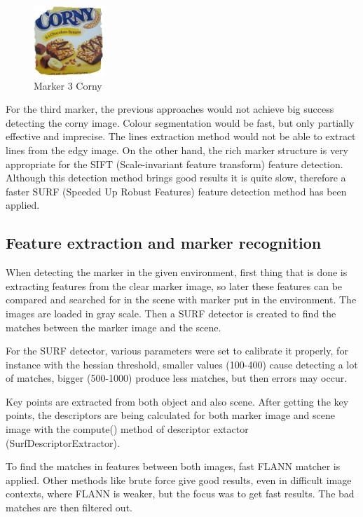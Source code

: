 \begin{figure}[ht!]
	\centering
	\includegraphics[width=100px]{figures/Marker3}
	\caption{Marker 3 Corny}
	\label{fig:markerCorny}
\end{figure}

For the third marker, the previous approaches would not achieve big success detecting the corny image. Colour segmentation would be fast, but only partially effective and imprecise. The lines extraction method would not be able to extract lines from the edgy image. On the other hand, the rich marker structure is very appropriate for the SIFT (Scale-invariant feature transform) feature detection. Although this detection method brings good results it is quite slow, therefore a faster SURF (Speeded Up Robust Features) feature detection method has been applied. 

\subsection{Feature extraction and marker recognition}

When detecting the marker in the given environment, first thing that is done is extracting features from the clear marker image, so later these features can be compared and searched for in the scene with marker put in the environment. The images are loaded in gray scale. Then a SURF detector is created to find the matches between the marker image and the scene. 

For the SURF detector, various parameters were set to calibrate it properly, for instance with the hessian threshold, smaller values (100-400) cause detecting a lot of matches, bigger (500-1000) produce less matches, but then errors may occur. 

Key points are extracted from both object and also scene. After getting the key points, the descriptors are being calculated for both marker image and scene image with the compute() method of descriptor extactor (SurfDescriptorExtractor). 

To find the matches in features between both images, fast FLANN matcher is applied. Other methods like brute force give good results, even in difficult image contexts, where FLANN is weaker, but the focus was to get fast results. The bad matches are then filtered out.

